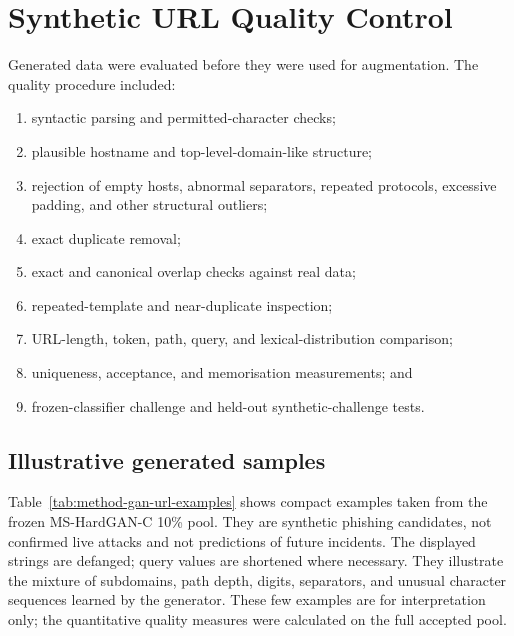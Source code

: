 \section{Synthetic URL Quality Control}

Generated data were evaluated before they were used for augmentation. The
quality procedure included:

\begin{enumerate}
    \item syntactic parsing and permitted-character checks;
    \item plausible hostname and top-level-domain-like structure;
    \item rejection of empty hosts, abnormal separators, repeated protocols,
    excessive padding, and other structural outliers;
    \item exact duplicate removal;
    \item exact and canonical overlap checks against real data;
    \item repeated-template and near-duplicate inspection;
    \item URL-length, token, path, query, and lexical-distribution comparison;
    \item uniqueness, acceptance, and memorisation measurements; and
    \item frozen-classifier challenge and held-out synthetic-challenge tests.
\end{enumerate}

\subsection{Illustrative generated samples}

Table~\ref{tab:method-gan-url-examples} shows compact examples taken from the
frozen MS-HardGAN-C 10\% pool. They are synthetic phishing candidates, not
confirmed live attacks and not predictions of future incidents. The displayed
strings are defanged; query values are shortened where necessary. They
illustrate the mixture of subdomains, path depth, digits, separators, and
unusual character sequences learned by the generator. These few examples are
for interpretation only; the quantitative quality measures were calculated on
the full accepted pool.

